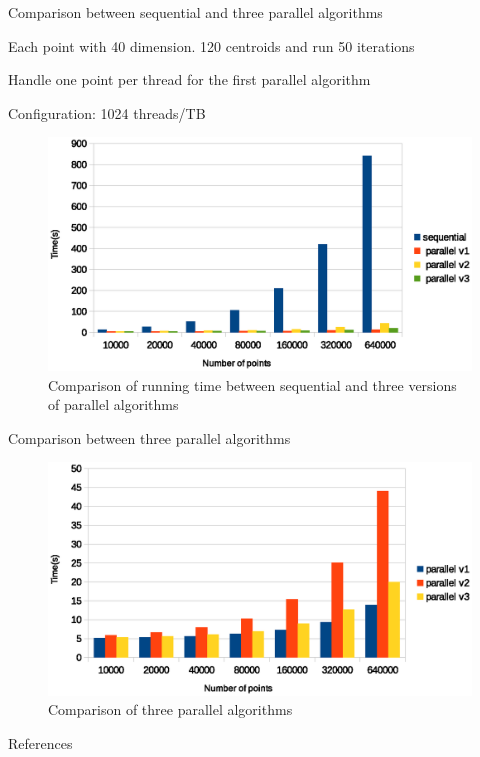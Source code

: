 \documentclass[
nopagebreaks,
style=klope,
fleqn]{powerdot}
\begin{document}
\begin{slide}{Comparison between sequential and three parallel algorithms}
  \begin{compactitem}
  \item{Each point with 40 dimension. 120 centroids and run 50 iterations}
  \item{Handle one point per thread for the first parallel algorithm}
  \item{Configuration: 1024 threads/TB}
  \end{compactitem}
  \begin{figure}[!h]
    \centering
    \includegraphics[width=0.7\linewidth]{fig/all_comparison}
    \caption{Comparison of running time between sequential and three versions of parallel algorithms}
    \label{fig:all}
  \end{figure}
\end{slide}

\begin{slide}{Comparison between three parallel algorithms}
  \begin{figure}[!h]
    \centering  
    \includegraphics[width=0.9\linewidth]{fig/parallel_algorithm_comparison}
    \caption{Comparison of three parallel algorithms}
    \label{fig:par}
  \end{figure}
\end{slide}

\begin{slide} {References}
\footnotesize


\end{slide}
\end{document}
